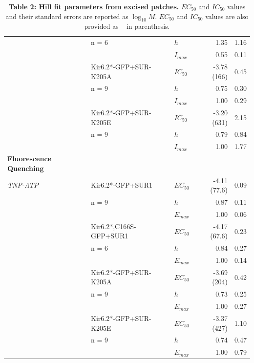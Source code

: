 \documentclass[10pt,lineno, doublespacing]{elife}
\begin{document}
\begin{table}
\begin{tabular}{p{32mm} l l r r}
                 & n = 6                  & $h$       & 1.35         & 1.16\\
                 &                        & $I_{max}$ & 0.55         & 0.11\\
\cmidrule{2-5}
                 & Kir6.2*-GFP+SUR-K205A  & $IC_{50}$ & -3.78 (166)  & 0.45\\
                 & n = 9                  & $h$       & 0.75         & 0.30\\
                 &                        & $I_{max}$ & 1.00         & 0.29\\
\cmidrule{2-5}
                 & Kir6.2*-GFP+SUR-K205E  & $IC_{50}$ & -3.20 (631)  & 2.15\\
                 & n = 9                  & $h$       & 0.79         & 0.84\\
                 &                        & $I_{max}$ & 1.00         & 1.77\\
\cmidrule{2-5}
\textbf{Fluorescence Quenching} & & & & \\
\midrule
\textit{TNP-ATP} & Kir6.2*-GFP+SUR1       & $EC_{50}$ & -4.11 (77.6) & 0.09\\
                 & n = 9                  & $h$       & 0.87         & 0.11\\
                 &                        & $E_{max}$ & 1.00         & 0.06\\
\cmidrule{2-5}
                 & Kir6.2*,C166S-GFP+SUR1 & $EC_{50}$ & -4.17 (67.6) & 0.23\\
                 & n = 6                  & $h$       & 0.84         & 0.27\\
                 &                        & $E_{max}$ & 1.00         & 0.14\\
\cmidrule{2-5}
                 & Kir6.2*-GFP+SUR-K205A  & $EC_{50}$ & -3.69 (204)  & 0.42\\
                 & n = 9                  & $h$       & 0.73         & 0.25\\
                 &                        & $E_{max}$ & 1.00         & 0.27\\
\cmidrule{2-5}
                 & Kir6.2*-GFP+SUR-K205E  & $EC_{50}$ & -3.37 (427)  & 1.10\\
                 & n = 9                  & $h$       & 0.74         & 0.47\\
                 &                        & $E_{max}$ & 1.00         & 0.79\\
\midrule
\end{tabular}
\caption{\label{table:pc} \textbf{Table 2: Hill fit parameters from excised patches.} $EC_{50}$ and $IC_{50}$ values and their standard errors are reported as $\log_{10}M$. $EC_{50}$  and $IC_{50}$ values are also provided as \si{\micro\Molar} in parenthesis.}
\endgroup{}
\end{table}
\end{document}
